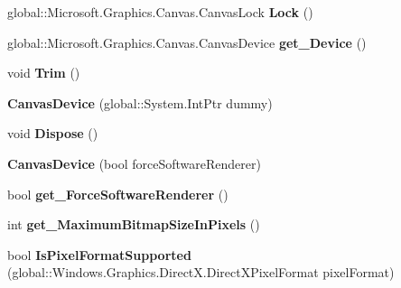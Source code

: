 \begin{DoxyCompactItemize}
global\+::\+Microsoft.\+Graphics.\+Canvas.\+Canvas\+Lock {\bfseries Lock} ()
\item 
\mbox{\label{class_microsoft_1_1_graphics_1_1_canvas_1_1_canvas_device_a9a79960381076f722b1ecba748e5ef20}} 
global\+::\+Microsoft.\+Graphics.\+Canvas.\+Canvas\+Device {\bfseries get\+\_\+\+Device} ()
\item 
\mbox{\label{class_microsoft_1_1_graphics_1_1_canvas_1_1_canvas_device_a8dad763b64fdb6a584603b49fa0998ed}} 
void {\bfseries Trim} ()
\item 
\mbox{\label{class_microsoft_1_1_graphics_1_1_canvas_1_1_canvas_device_a0b344b18a95245487b5ec88f09efd311}} 
{\bfseries Canvas\+Device} (global\+::\+System.\+Int\+Ptr dummy)
\item 
\mbox{\label{class_microsoft_1_1_graphics_1_1_canvas_1_1_canvas_device_a9613f1f6bab02464823bd1e9d55c8374}} 
void {\bfseries Dispose} ()
\item 
\mbox{\label{class_microsoft_1_1_graphics_1_1_canvas_1_1_canvas_device_a92581b24422598de5948e89c9ba6eb53}} 
{\bfseries Canvas\+Device} (bool force\+Software\+Renderer)
\item 
\mbox{\label{class_microsoft_1_1_graphics_1_1_canvas_1_1_canvas_device_a0583e03d53b172ea1a1220e1df5b2616}} 
bool {\bfseries get\+\_\+\+Force\+Software\+Renderer} ()
\item 
\mbox{\label{class_microsoft_1_1_graphics_1_1_canvas_1_1_canvas_device_af71c8661ed6a571c7678dfcd97de7bc8}} 
int {\bfseries get\+\_\+\+Maximum\+Bitmap\+Size\+In\+Pixels} ()
\item 
\mbox{\label{class_microsoft_1_1_graphics_1_1_canvas_1_1_canvas_device_a01381b0e199054ee3d65ce1d6916972f}} 
bool {\bfseries Is\+Pixel\+Format\+Supported} (global\+::\+Windows.\+Graphics.\+Direct\+X.\+Direct\+X\+Pixel\+Format pixel\+Format)

\end{DoxyCompactItemize}

